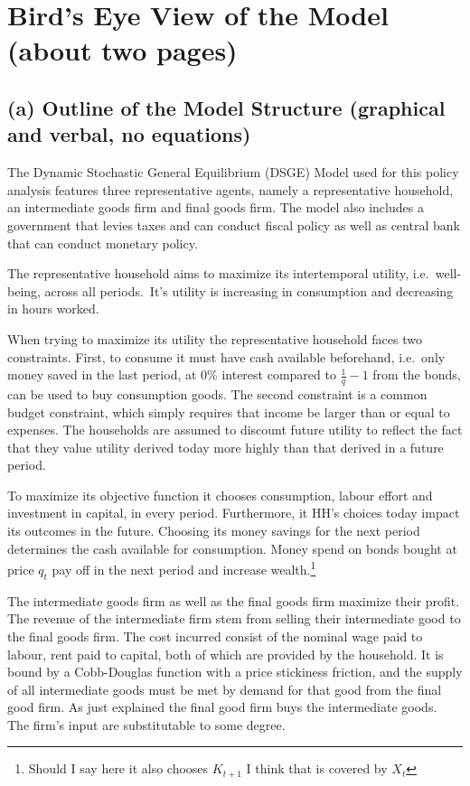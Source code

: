 \documentclass[12pt]{article}
\begin{document}
\section{Bird’s Eye View of the Model (about two pages)}


\subsection*{(a) Outline of the Model Structure (graphical and verbal, no equations)}
The Dynamic Stochastic General Equilibrium (DSGE) Model used for this policy analysis features
three representative agents, namely a representative household, an intermediate goods firm and final goods firm. The model also includes a government that levies taxes and can conduct fiscal policy as well as central bank that can conduct monetary policy. 

The representative household aims to maximize its intertemporal utility, i.e.~well-being, across all periods.\ It's utility is increasing in consumption and decreasing in hours worked. 

When trying to maximize its utility the representative household faces two constraints. First, to consume it must have cash available beforehand, i.e.\ only money saved in the last period, at 0\% interest compared to $\frac{1}{q} -1$ from the bonds, can be used to buy consumption goods. 
The second constraint is a common budget constraint, which simply requires that income be larger than or equal to expenses.  The households are assumed to discount future utility to reflect the fact that they value utility derived today more highly than that derived in a future period.

To maximize its objective function it chooses consumption, labour effort and investment in capital, in every period. %
Furthermore, it HH's choices today impact its outcomes in the future. Choosing its money savings for the next period determines the cash available for consumption. Money spend on bonds bought at price $q_t$ pay off in the next period and increase wealth.\footnote{Should I say here it also chooses $K_{t+1}$ I think that is covered by $X_t$} 

The intermediate goods firm as well as the final goods firm maximize their profit. The revenue of the intermediate firm stem from selling their intermediate good to the final goods firm. The cost incurred consist of the nominal wage paid to labour, rent paid to capital, both of which are provided by the household. It is bound by a Cobb-Douglas function with a price stickiness friction, and the supply of all intermediate goods must be met by demand for that good from the final good firm.  As just explained the final good firm buys the intermediate goods. The firm's input are substitutable to some degree. 
\end{document}
